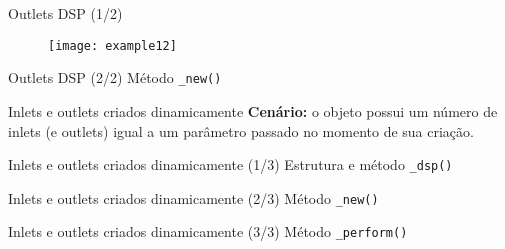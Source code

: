 \begin{frame}{Outlets DSP (1/2)}
\begin{figure}[h!]
\centering
\texttt{[image: example12]}
\end{figure}
\end{frame}


\begin{frame}{Outlets DSP (2/2)}
{Método \texttt{\_new()}}

\end{frame}


\begin{frame}{Inlets e outlets criados dinamicamente}
\textbf{Cenário:} o objeto possui um número de inlets (e outlets) igual a um parâmetro
passado no momento de sua criação. 
\end{frame}


\begin{frame}{Inlets e outlets criados dinamicamente (1/3)}
{Estrutura e método \texttt{\_dsp()}}

\end{frame}


\begin{frame}{Inlets e outlets criados dinamicamente (2/3)}
{Método \texttt{\_new()}}

\end{frame}


\begin{frame}{Inlets e outlets criados dinamicamente (3/3)}
{Método \texttt{\_perform()}}

\end{frame}
